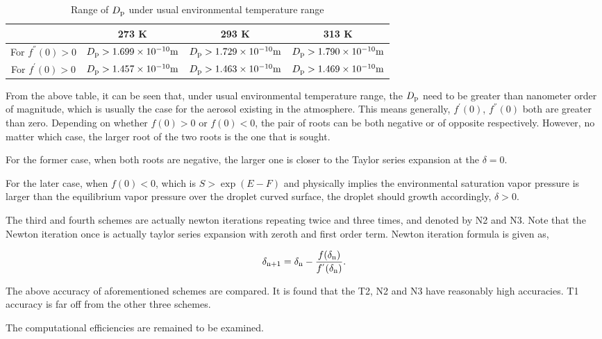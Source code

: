\documentclass[12pt]{article}
\begin{document}
\begin{table}\label{table:2}
\caption{Range of $D_{\rm p}$ under usual environmental temperature range}
\begin{center}
\begin{tabular}{cccc} \hline
   & 273 K  &  293 K  &  313 K \\ \hline
For $f^{''}(0)>0 $ & $D_{\rm p}>1.699\times 10^{-10} \rm m$  & $D_{\rm p}>1.729\times 10^{-10} \rm m$ & $D_{\rm p}>1.790\times 10^{-10} \rm m$   \\ 
For $f^{'}(0)>0 $  & $D_{\rm p}>1.457\times 10^{-10} \rm m$ &  $D_{\rm p}>1.463\times 10^{-10} \rm m$ & $D_{\rm p}>1.469\times 10^{-10 \rm } \rm m$ \\ \hline
\end{tabular}
\end{center}
\end{table}

From the above table, it can be seen that, under usual environmental temperature range, the $D_{\rm p}$ need to be greater than nanometer order of magnitude, which is usually the case for the aerosol existing in the atmosphere.
This means generally, $f^{'}(0)$, $f^{''}(0)$ both are greater than zero. Depending on whether $f(0)>0$ or $f(0)<0$, the pair of roots can be both negative or of opposite respectively. However, no matter which case, the larger root of the two roots is the one that is sought. 

For the former case, when both roots are negative, the larger one is closer to the Taylor series expansion at the $\delta=0$. 


For the later case, when $f(0)<0$, which is $S>\exp(E-F)$ and physically implies the environmental saturation vapor pressure is larger than the equilibrium vapor pressure over the droplet curved surface, the droplet should growth accordingly, $\delta>0$.


The third and fourth schemes are actually newton iterations repeating twice and three times, and denoted by N2 and N3. Note that the Newton iteration once is actually taylor series expansion with zeroth and first order term. Newton iteration formula is given as,

\begin{equation}
\delta_{\rm n+1}=\delta_{\rm n}-\frac{f(\delta_{\rm n})}{f^{'}(\delta_{\rm n})}.
\end{equation}

The above accuracy of aforementioned schemes are compared. It is found that the T2, N2 and N3 have reasonably high accuracies. T1 accuracy is far off from the other three schemes.

 
The computational efficiencies are remained to be examined.
 
\end{document}

